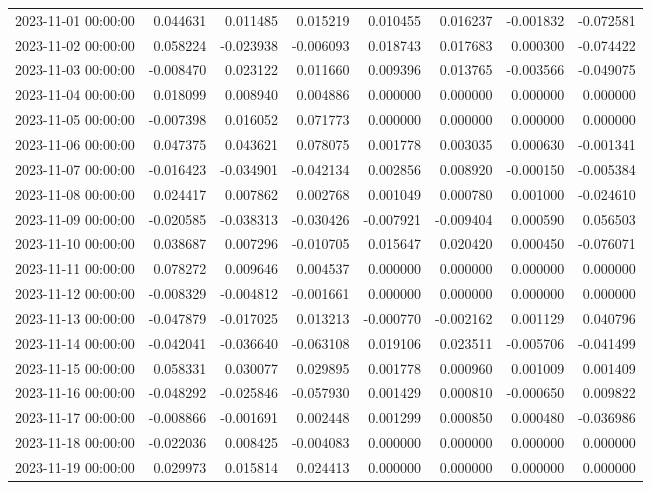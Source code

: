 \begin{tabular}{lrrrrrrr}
2023-11-01 00:00:00 & 0.044631 & 0.011485 & 0.015219 & 0.010455 & 0.016237 & -0.001832 & -0.072581 \\
2023-11-02 00:00:00 & 0.058224 & -0.023938 & -0.006093 & 0.018743 & 0.017683 & 0.000300 & -0.074422 \\
2023-11-03 00:00:00 & -0.008470 & 0.023122 & 0.011660 & 0.009396 & 0.013765 & -0.003566 & -0.049075 \\
2023-11-04 00:00:00 & 0.018099 & 0.008940 & 0.004886 & 0.000000 & 0.000000 & 0.000000 & 0.000000 \\
2023-11-05 00:00:00 & -0.007398 & 0.016052 & 0.071773 & 0.000000 & 0.000000 & 0.000000 & 0.000000 \\
2023-11-06 00:00:00 & 0.047375 & 0.043621 & 0.078075 & 0.001778 & 0.003035 & 0.000630 & -0.001341 \\
2023-11-07 00:00:00 & -0.016423 & -0.034901 & -0.042134 & 0.002856 & 0.008920 & -0.000150 & -0.005384 \\
2023-11-08 00:00:00 & 0.024417 & 0.007862 & 0.002768 & 0.001049 & 0.000780 & 0.001000 & -0.024610 \\
2023-11-09 00:00:00 & -0.020585 & -0.038313 & -0.030426 & -0.007921 & -0.009404 & 0.000590 & 0.056503 \\
2023-11-10 00:00:00 & 0.038687 & 0.007296 & -0.010705 & 0.015647 & 0.020420 & 0.000450 & -0.076071 \\
2023-11-11 00:00:00 & 0.078272 & 0.009646 & 0.004537 & 0.000000 & 0.000000 & 0.000000 & 0.000000 \\
2023-11-12 00:00:00 & -0.008329 & -0.004812 & -0.001661 & 0.000000 & 0.000000 & 0.000000 & 0.000000 \\
2023-11-13 00:00:00 & -0.047879 & -0.017025 & 0.013213 & -0.000770 & -0.002162 & 0.001129 & 0.040796 \\
2023-11-14 00:00:00 & -0.042041 & -0.036640 & -0.063108 & 0.019106 & 0.023511 & -0.005706 & -0.041499 \\
2023-11-15 00:00:00 & 0.058331 & 0.030077 & 0.029895 & 0.001778 & 0.000960 & 0.001009 & 0.001409 \\
2023-11-16 00:00:00 & -0.048292 & -0.025846 & -0.057930 & 0.001429 & 0.000810 & -0.000650 & 0.009822 \\
2023-11-17 00:00:00 & -0.008866 & -0.001691 & 0.002448 & 0.001299 & 0.000850 & 0.000480 & -0.036986 \\
2023-11-18 00:00:00 & -0.022036 & 0.008425 & -0.004083 & 0.000000 & 0.000000 & 0.000000 & 0.000000 \\
2023-11-19 00:00:00 & 0.029973 & 0.015814 & 0.024413 & 0.000000 & 0.000000 & 0.000000 & 0.000000 \\

\end{tabular}
